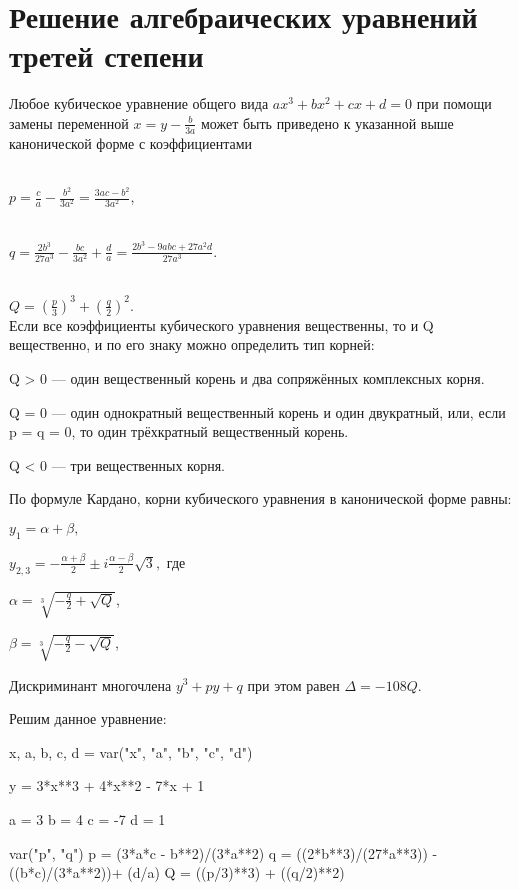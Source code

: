 \section{Решение алгебраических уравнений третей степени}
Любое кубическое уравнение общего вида
$ax^{3}+bx^{2}+cx+d=0$
при помощи замены переменной
$x=y-{\frac{b}{3a}}$
может быть приведено к указанной выше канонической форме с коэффициентами

~\\
$p={\frac  {c}{a}}-{\frac  {b^{2}}{3a^{2}}}={\frac  {3ac-b^{2}}{3a^{2}}}$,

~\\
$q={\frac  {2b^{3}}{27a^{3}}}-{\frac  {bc}{3a^{2}}}+{\frac  {d}{a}}={\frac  {2b^{3}-9abc+27a^{2}d}{27a^{3}}}.$

~\\
$Q=\left({\frac  {p}{3}}\right)^{3}+\left({\frac  {q}{2}}\right)^{2}.$
~\\

Если все коэффициенты кубического уравнения вещественны, то и Q вещественно, и по его знаку можно определить тип корней:

Q > 0 — один вещественный корень и два сопряжённых комплексных корня.

Q = 0 — один однократный вещественный корень и один двукратный, или, если p = q = 0, то один трёхкратный вещественный корень.

Q < 0 — три вещественных корня.

По формуле Кардано, корни кубического уравнения в канонической форме равны:

$\displaystyle y_{1}=\alpha +\beta ,$

$y_{{2,3}}=-{\frac  {\alpha +\beta }{2}}\pm i{\frac  {\alpha -\beta }{2}}{\sqrt  {3}},$ где

$\alpha =\sqrt[ {3}]{-{\frac  {q}{2}}+{\sqrt  {Q}}}$,

$\beta =\sqrt[ {3}]{-{\frac  {q}{2}}-{\sqrt  {Q}}}$,

Дискриминант многочлена $y^{3}+py+q$ при этом равен $\Delta =-108Q$.

Решим данное уравнение:

\begin{sagesilent}
	x, a, b, c, d = var("x", "a", "b", "c", "d")

	y = 3*x**3 + 4*x**2 - 7*x + 1 
	
	a = 3
	b = 4
	c = -7
	d = 1
	
	var("p", "q")
	p = (3*a*c - b**2)/(3*a**2)
	q = ((2*b**3)/(27*a**3)) - ((b*c)/(3*a**2))+ (d/a)
	Q = ((p/3)**3) + ((q/2)**2)
\end{sagesilent}

